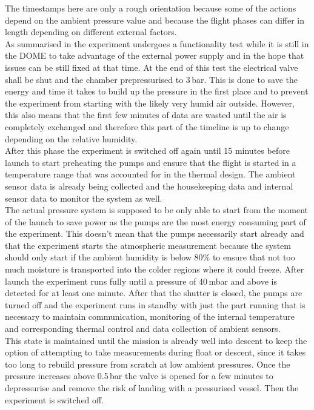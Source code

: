 The timestamps here are only a rough orientation because some of the actions depend on the ambient pressure value and because the flight phases can differ in length depending on different external factors.  \\
As summarised in  the experiment undergoes a functionality test while it is still in the DOME to take advantage of the external power supply and in the hope that issues can be still fixed at that time. At the end of this test the electrical valve shall be shut and the chamber prepressurised to 3\,bar. This is done to save the energy and time it takes to build up the pressure in the first place and to prevent the experiment from starting with the likely very humid air outside. However, this also means that the first few minutes of data are wasted until the air is completely exchanged and therefore this part of the timeline is up to change depending on the relative humidity.\\
After this phase the experiment is switched off again until 15 minutes before launch to start preheating the pumps and ensure that the flight is started in a temperature range that was accounted for in the thermal design. The ambient sensor data is already being collected and the housekeeping data and internal sensor data to monitor the system as well. \\
The actual pressure system is supposed to be only able to start from the moment of the launch to save power as the pumps are the most energy consuming part of the experiment. This doesn't mean that the pumps necessarily start already and that the experiment starts the atmospheric measurement because the system should only start if the ambient humidity is below 80\% to ensure that not too much moisture is transported into the colder regions where it could freeze. After launch the experiment runs fully until a pressure of 40\,mbar and above is detected for at least one minute. After that the shutter is closed, the pumps are turned off and the experiment runs in standby with just the part running that is necessary to maintain communication, monitoring of the internal temperature and corresponding thermal control and data collection of ambient sensors.\\
This state is maintained until the mission is already well into descent to keep the option of attempting to take measurements during float or descent, since it takes too long to rebuild pressure from scratch at low ambient pressures. Once the pressure increases above 0.5\,bar the valve is opened for a few minutes to depressurise and remove the risk of landing with a pressurised vessel. Then the experiment is switched off. \\


